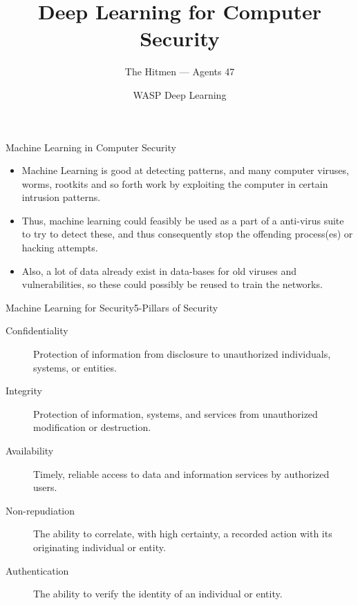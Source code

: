 \documentclass{beamer}
\title{Deep Learning for Computer Security}
\date{WASP Deep Learning}
\author[Agents 47]{The Hitmen --- Agents 47}
\begin{document}
\begin{frame}
  \titlepage
\end{frame}

\begin{frame}{Machine Learning in Computer Security}

  \begin{itemize}

  \item Machine Learning is good at detecting patterns, and many computer
    viruses, worms, rootkits and so forth work by exploiting the computer in
    certain intrusion patterns.

  \item Thus, machine learning could feasibly be used as a part of a anti-virus
    suite to try to detect these, and thus consequently stop the offending
    process(es) or hacking attempts.

  \item Also, a lot of data already exist in data-bases for old viruses and
    vulnerabilities, so these could possibly be reused to train the networks.

  \end{itemize}

\end{frame}


\begin{frame}{Machine Learning for Security}{5-Pillars of Security}


  \begin{description}

  \item[Confidentiality] Protection of information from disclosure to
    unauthorized individuals, systems, or entities.

  \item[Integrity] Protection of information, systems, and services from
    unauthorized modification or destruction.

  \item[Availability] Timely, reliable access to data and information services
    by authorized users.

  \item[Non-repudiation] The ability to correlate, with high certainty, a
    recorded action with its originating individual or entity.

  \item[Authentication] The ability to verify the identity of an individual or
    entity.

  \end{description}

\end{frame}
\end{document}
